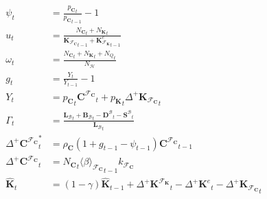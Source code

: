 \documentclass[a4paper, headings=standardclasses]{scrartcl}
\numberwithin{equation}{subsection}
\begin{document}
{\begin{align}
		\psi_t                                            & = \frac{{p_\mathbf{C}}_t}{{p_\mathbf{C}}_{t-1}} - 1 \\
		u_t                                               & = \frac{{N_\mathbf{C}}_t + {N_\mathbf{K}}_t}{{\mathbf{K}_{\mathcal{F}_\mathbf{C}}}_{t-1} + {\mathbf{K}_{\mathcal{F}_\mathbf{K}}^e}_{t-1}} \\
		\omega_t                                          & = \frac{{N_\mathbf{C}}_t + {N_\mathbf{K}}_t + {N_Q}_t}{N_\mathcal{H}}                                                                                                                                                                             \\
		g_t                                               & = \frac{Y_t}{Y_{t-1}} - 1                                                                                                                                                                                                                                                     \\
		Y_t                                               & = {p_\mathbf{C}}_t{\mathbf{C}^{\mathcal{F}_\mathbf{C}}}_t + {p_\mathbf{K}}_t {\Delta^+\mathbf{K}_{\mathcal{F}_\mathbf{C}}}_t                                                                                                                                                  \\
		\Gamma_t                                          & = \frac{{\mathbf{L}_\mathcal{B}}_t + {\mathbf{B}_\mathcal{B}}_t - {\mathbf{D}^\mathcal{B}}_t - {\mathbf{S}^\mathcal{B}}_t}{{\mathbf{L}_\mathcal{B}}_t}                                                                                                                        \\
		{\Delta^+\mathbf{C}^{\mathcal{F}_\mathbf{C}}}^*_t & = \rho_\mathbf{C} (1 + g_{t-1} - \psi_{t-1}) {\mathbf{C}^{\mathcal{F}_\mathbf{C}}}_{t-1}                                                                                                                                                                                      \\
		{\Delta^+\mathbf{C}^{\mathcal{F}_\mathbf{C}}}_t   & = {N_\mathbf{C}}_t {\langle \beta \rangle_{\mathcal{F}_\mathbf{C}}}_{t-1} k_{\mathcal{F}_\mathbf{C}}  \\
		{\hat{\mathbf{K}}}_t                              & = (1-\gamma) \hat{\mathbf{K}}_{t-1} + {\Delta^+\mathbf{K}^{\mathcal{F}_\mathbf{K}}}_t - {\Delta^+\mathbf{K}^e}_t - {\Delta^+\mathbf{K}_{\mathcal{F}_\mathbf{C}}}_t    \\

\end{align}}
\end{document}
